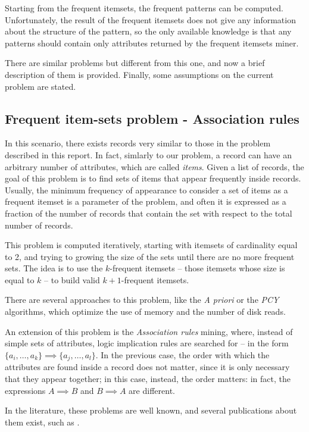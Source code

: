 \documentclass{acm_proc_article-sp-sigmod09}
\begin{document}
Starting from the frequent itemsets, the frequent patterns can be computed. Unfortunately, the result of the frequent itemsets does not give any information about the structure of the pattern, so the only available knowledge is that any patterns should contain only attributes returned by the frequent itemsets miner.

There are similar problems but different from this one, and now a brief description of them is provided. Finally, some assumptions on the current problem are stated.

\subsection{Frequent item-sets problem - Association rules}
\label{sec:freqitemset}
In this scenario, there exists records very similar to those in the problem described in this report. In fact, simlarly to our problem, a record can have an arbitrary number of attributes, which are called \emph{items}. Given a list of records, the goal of this problem is to find sets of items that appear frequently inside records. Usually, the minimum frequency of appearance to consider a set of items as a frequent itemset is a parameter of the problem, and often it is expressed as a fraction of the number of records that contain the set with respect to the total number of records.

This problem is computed iteratively, starting with itemsets of cardinality equal to 2, and trying to growing the size of the sets until there are no more frequent sets. The idea is to use the $k$-frequent itemsets -- those itemsets whose size is equal to $k$ -- to build valid $k + 1$-frequent itemsets.

There are several approaches to this problem, like the \emph{A priori} or the \emph{PCY} algorithms, which optimize the use of memory and the number of disk reads.

An extension of this problem is the \emph{Association rules} mining, where, instead of simple sets of attributes, logic implication rules are searched for -- in the form $\{a_i, \dotsc, a_k\} \implies \{a_j, \dotsc, a_l\}$. In the previous case, the order with which the attributes are found inside a record does not matter, since it is only necessary that they appear together; in this case, instead, the order matters: in fact, the expressions $A \implies B$ and $B \implies A$ are different.

In the literature, these problems are well known, and several publications about them exist, such as \cite{agrawal1994fast, ivancsy2006time, rakesh1993mining, brin1997dynamic}.
\end{document}
